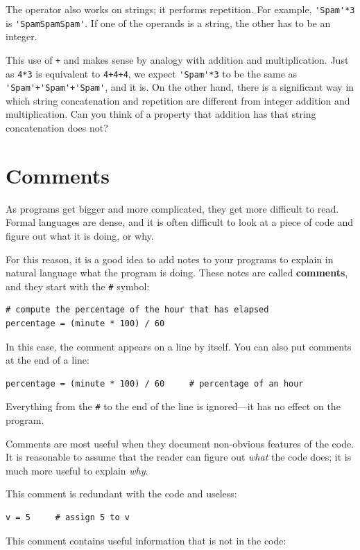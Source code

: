 \documentclass[10pt]{book}
\begin{document}
The {\tt *} operator also works on strings; it performs repetition.
For example, \verb"'Spam'*3" is \verb"'SpamSpamSpam'".  If one of the operands
is a string, the other has to be an integer.

This use of {\tt +} and {\tt *} makes sense by
analogy with addition and multiplication.  Just as {\tt 4*3} is
equivalent to {\tt 4+4+4}, we expect \verb"'Spam'*3" to be the same as
\verb"'Spam'+'Spam'+'Spam'", and it is.  On the other hand, there is a
significant way in which string concatenation and repetition are
different from integer addition and multiplication.
Can you think of a property that addition has
that string concatenation does not?



\section{Comments}

As programs get bigger and more complicated, they get more difficult
to read.  Formal languages are dense, and it is often difficult to
look at a piece of code and figure out what it is doing, or why.

For this reason, it is a good idea to add notes to your programs to explain
in natural language what the program is doing.  These notes are called
{\bf comments}, and they start with the \verb"#" symbol:

\beforeverb
\begin{verbatim}
# compute the percentage of the hour that has elapsed
percentage = (minute * 100) / 60
\end{verbatim}
\afterverb
%
In this case, the comment appears on a line by itself.  You can also put
comments at the end of a line:

\beforeverb
\begin{verbatim}
percentage = (minute * 100) / 60     # percentage of an hour
\end{verbatim}
\afterverb
%
Everything from the {\tt \#} to the end of the line is ignored---it
has no effect on the program.

Comments are most useful when they document non-obvious features of
the code.  It is reasonable to assume that the reader can figure out
{\em what} the code does; it is much more useful to explain {\em why}.

This comment is redundant with the code and useless:

\beforeverb
\begin{verbatim}
v = 5     # assign 5 to v
\end{verbatim}
\afterverb
%
This comment contains useful information that is not in the code:
\end{document}
